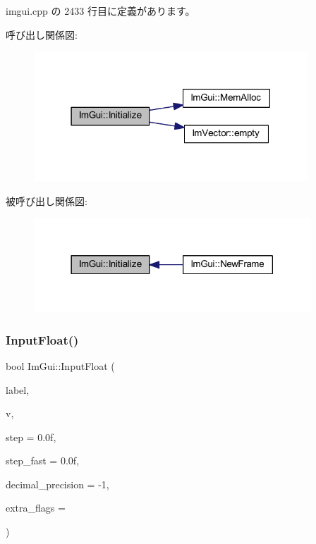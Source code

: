  imgui.\+cpp の 2433 行目に定義があります。

呼び出し関係図\+:\nopagebreak
\begin{figure}[H]
\begin{center}
\leavevmode
\includegraphics[width=291pt]{namespace_im_gui_a1a611da38fae18a3d1dafcb3228259da_cgraph}
\end{center}
\end{figure}
被呼び出し関係図\+:\nopagebreak
\begin{figure}[H]
\begin{center}
\leavevmode
\includegraphics[width=294pt]{namespace_im_gui_a1a611da38fae18a3d1dafcb3228259da_icgraph}
\end{center}
\end{figure}
\mbox{\label{namespace_im_gui_a94e4bba578bb1ab757a85c86d4a659d8}} 
\subsubsection{\texorpdfstring{Input\+Float()}{InputFloat()}}
{\footnotesize\ttfamily bool Im\+Gui\+::\+Input\+Float (\begin{DoxyParamCaption}\item[{const char $\ast$}]{label,  }\item[{float $\ast$}]{v,  }\item[{float}]{step = {\ttfamily 0.0f},  }\item[{float}]{step\+\_\+fast = {\ttfamily 0.0f},  }\item[{int}]{decimal\+\_\+precision = {\ttfamily -\/1},  }\item[{\mbox{\hyperlink{imgui_8h_a7d2c6153a6b9b5d3178ce82434ac9fb8}{Im\+Gui\+Input\+Text\+Flags}}}]{extra\+\_\+flags = {} }\end{DoxyParamCaption})}



